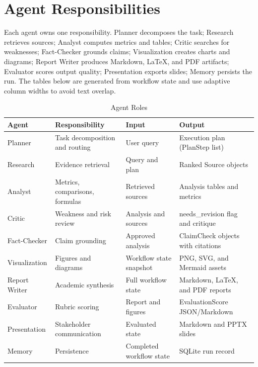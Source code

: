 \documentclass[11pt]{article}
\begin{document}
\section{Agent Responsibilities}
Each agent owns one responsibility. Planner decomposes the task; Research retrieves sources; Analyst computes metrics and tables; Critic searches for weaknesses; Fact-Checker grounds claims; Visualization creates charts and diagrams; Report Writer produces Markdown, LaTeX, and PDF artifacts; Evaluator scores output quality; Presentation exports slides; Memory persists the run. The tables below are generated from workflow state and use adaptive column widths to avoid text overlap.


\begin{table}[!htbp]
\centering
\caption{Agent Roles}
\label{tab:state-table-1}
\begingroup
\scriptsize
\setlength{\tabcolsep}{2.8pt}
\renewcommand{\arraystretch}{1.35}
\begin{adjustbox}{max width=\textwidth}
\begin{tabularx}{\textwidth}{@{}>{\RaggedRight\arraybackslash}p{}YYY@{}}
\toprule
\textbf{Agent} & \textbf{Responsibility} & \textbf{Input} & \textbf{Output} \\
\midrule
Planner & Task decomposition and routing & User query & Execution plan (PlanStep list) \\
Research & Evidence retrieval & Query and plan & Ranked Source objects \\
Analyst & Metrics, comparisons, formulas & Retrieved sources & Analysis tables and metrics \\
Critic & Weakness and risk review & Analysis and sources & needs\_revision flag and critique \\
Fact-Checker & Claim grounding & Approved analysis & ClaimCheck objects with citations \\
Visualization & Figures and diagrams & Workflow state snapshot & PNG, SVG, and Mermaid assets \\
Report Writer & Academic synthesis & Full workflow state & Markdown, LaTeX, and PDF reports \\
Evaluator & Rubric scoring & Report and figures & EvaluationScore JSON/Markdown \\
Presentation & Stakeholder communication & Evaluated state & Markdown and PPTX slides \\
Memory & Persistence & Completed workflow state & SQLite run record \\
\bottomrule
\end{tabularx}
\end{adjustbox}
\endgroup
\end{table}
\FloatBarrier
\end{document}
